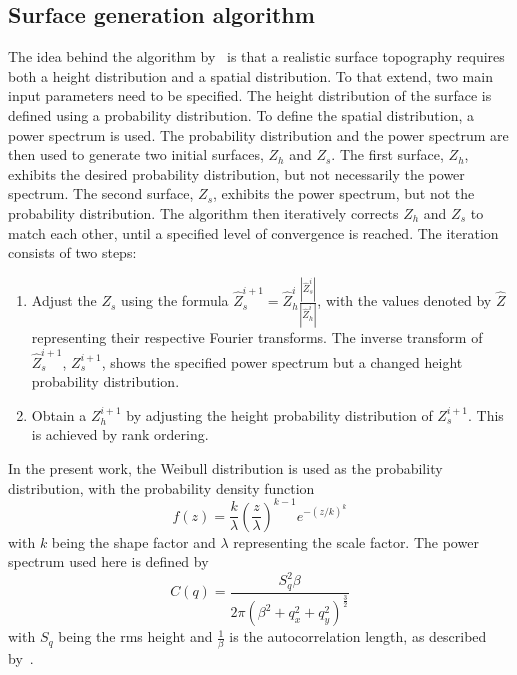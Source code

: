 \subsection{Surface generation algorithm}\label{subsec: Surface generation algorithm}

The idea behind the algorithm by~\cite{perez-rafolsGeneratingRandomlyRough2019} is that a realistic surface topography requires both a height distribution and a spatial distribution.
To that extend, two main input parameters need to be specified.
The height distribution of the surface is defined using a probability distribution.
To define the spatial distribution, a power spectrum is used.
The probability distribution and the power spectrum are then used to generate two initial surfaces, $Z_h$ and $Z_s$.
The first surface, $Z_h$, exhibits the desired probability distribution, but not necessarily the power spectrum.
The second surface, $Z_s$, exhibits the power spectrum, but not the probability distribution.
The algorithm then iteratively corrects $Z_h$ and $Z_s$ to match each other, until a specified level of convergence is reached.
The iteration consists of two steps:
\begin{enumerate}
    \item Adjust the $Z_s$ using the formula $\hat{Z}_s^{i+1} = \hat{Z}_h^i \frac{|\hat{Z}_s^i|}{|\hat{Z}_h^i|}$, with the values denoted by $\hat{Z}$ representing their respective Fourier transforms.
    The inverse transform of $\hat{Z}_s^{i+1}$, $Z_s^{i+1}$, shows the specified power spectrum but a changed height probability distribution.
    \item Obtain a $Z_h^{i+1}$ by adjusting the height probability distribution of $Z_s^{i+1}$.
    This is achieved by rank ordering.
\end{enumerate}
In the present work, the Weibull distribution is used as the probability distribution, with the probability density function
\begin{equation}\label{eq: Weibull distribution}
    f(z) = \frac{k}{\lambda} \left(\frac{z}{\lambda}\right)^{k-1} e^{-(z/k)^{k}}
\end{equation}
with $k$ being the shape factor and $\lambda$ representing the scale factor.
The power spectrum used here is defined by
\begin{equation}\label{eq: Power spectrum}
    C(q) = \frac{S_q^2 \beta}{2\pi\left(\beta^2 + q_x^2+q_y^2\right)^{\frac{3}{2}}}
\end{equation}
with $S_q$ being the rms height and $\frac{1}{\beta}$ is the autocorrelation length, as described by~\cite{perez-rafolsGeneratingRandomlyRough2019}.

